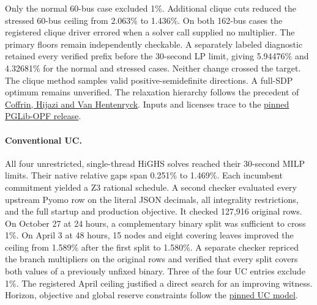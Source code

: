 \documentclass[11pt,letterpaper]{article}
\begin{document}
Only the normal 60-bus case excluded 1\%. Additional clique cuts reduced the stressed 60-bus ceiling from 2.063\% to 1.436\%. On both 162-bus cases the registered clique driver errored when a solver call supplied no multiplier. The primary floors remain independently checkable. A separately labeled diagnostic retained every verified prefix before the 30-second LP limit, giving 5.94476\% and 4.32681\% for the normal and stressed cases. Neither change crossed the target. The clique method samples valid positive-semidefinite directions. A full-SDP optimum remains unverified. The relaxation hierarchy follows the precedent of \href{https://arxiv.org/abs/1506.05202}{Coffrin, Hijazi and Van Hentenryck}. Inputs and licenses trace to the \href{https://github.com/power-grid-lib/pglib-opf/tree/dc6be4b2f85ca0e776952ec22cbd4c22396ea5a3}{pinned PGLib-OPF release}.

\paragraph{Conventional UC.} All four unrestricted, single-thread HiGHS solves reached their 30-second MILP limits. Their native relative gaps span 0.251\% to 1.469\%. Each incumbent commitment yielded a Z3 rational schedule. A second checker evaluated every upstream Pyomo row on the literal JSON decimals, all integrality restrictions, and the full startup and production objective. It checked 127,916 original rows. On October 27 at 24 hours, a complementary binary split was sufficient to cross 1\%. On April 3 at 48 hours, 15 nodes and eight covering leaves improved the ceiling from 1.589\% after the first split to 1.580\%. A separate checker repriced the branch multipliers on the original rows and verified that every split covers both values of a previously unfixed binary. Three of the four UC entries exclude 1\%. The registered April ceiling justified a direct search for an improving witness. Horizon, objective and global reserve constraints follow the \href{https://github.com/power-grid-lib/pglib-uc/tree/39a7f38cf4703de92f0291f0c873c2e98c789301}{pinned UC model}.
\end{document}
